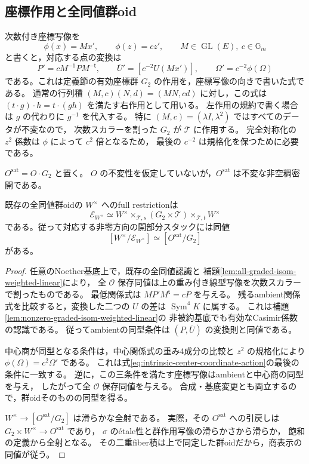 \subsection{座標作用と全同値群oid}

次数付き座標写像を
\[
            \phi(x)=Mx',\qquad \phi(z)=cz',\qquad
            M\in\operatorname{GL}(E),\ c\in\mathbb G_m
\]
と書くと，対応する点の変換は
\begin{equation}
\label{eq:intrinsic-center-coordinate-action}
 P'=cM^{-1}PM^{-\mathsf t},\qquad
 \overline U'=[c^{-2}U(Mx')],\qquad
 \Omega'=c^{-2}\phi(\Omega)
\end{equation}
である。これは定義節の有効座標群 $G_2$ の作用を，座標写像の向きで書いた式である。
通常の行列積 $(M,c)(N,d)=(MN,cd)$ に対し，この式は
$(t\cdot g)\cdot h=t\cdot(gh)$ を満たす右作用として用いる。
左作用の規約で書く場合は $g$ の代わりに $g^{-1}$ を代入する。
特に $(M,c)=(\lambda I,\lambda^2)$ ではすべてのデータが不変なので，
次数スカラーを割った $G_2$ が $\mathcal T$ に作用する。
完全対称化の $z^2$ 係数は $\phi$ によって $c^2$ 倍となるため，
最後の $c^{-2}$ は規格化を保つために必要である。

$O^{\mathrm{sat}}=O\cdot G_2$ と置く。
$O$ の不変性を仮定していないが，$O^{\mathrm{sat}}$ は不変な非空稠密開である。

\begin{proposition}[内在的中心torsorによる商表示]
\label{prop:intrinsic-center-full-groupoid}
既存の全同値群oidの $W^\times$ へのfull restrictionは
\[
 \mathcal E_{W^\times}
   \simeq W^\times\times_{\mathcal T,s}
                  (G_2\times\mathcal T)
                    \times_{\mathcal T,t}W^\times
\]
である。従って対応する非零方向の開部分スタックには同値
\[
                [W^\times/\mathcal E_{W^\times}]
                    \simeq[O^{\mathrm{sat}}/G_2]
\]
がある。
\end{proposition}
\begin{proof}
任意のNoether基底上で，既存の全同値認識と
補題\ref{lem:all-graded-isom-weighted-linear}により，
全 $\mathcal O$ 保存同値は上の重み付き線型写像を次数スカラーで割ったものである。
最低関係式は $MP'M^{\mathsf t}=cP$ を与える。
残るambient関係式を比較すると，変換した二つの $U$ の差は
$\operatorname{Sym}^4K$ に属する。
これは補題\ref{lem:nonzero-graded-isom-weighted-linear}の
非被約基底でも有効なCasimir係数の認識である。
従ってambientの同型条件は $(P,\overline U)$ の変換則と同値である。

中心商が同型となる条件は，中心関係式の重み4成分の比較と
$z^2$ の規格化により $\phi(\Omega)=c^2\Omega'$ である。
これは式\eqref{eq:intrinsic-center-coordinate-action}の最後の条件に一致する。
逆に，この三条件を満たす座標写像はambientと中心商の同型を与え，
したがって全 $\mathcal O$ 保存同値を与える。
合成・基底変更とも両立するので，群oidそのものの同型を得る。

$W^\times\to[O^{\mathrm{sat}}/G_2]$ は滑らかな全射である。
実際，その $O^{\mathrm{sat}}$ への引戻しは
$G_2\times W^\times\to O^{\mathrm{sat}}$ であり，
$\sigma$ の\'{e}tale性と群作用写像の滑らかさから滑らか，
飽和の定義から全射となる。
その二重fiber積は上で同定した群oidだから，商表示の同値が従う。
\end{proof}

